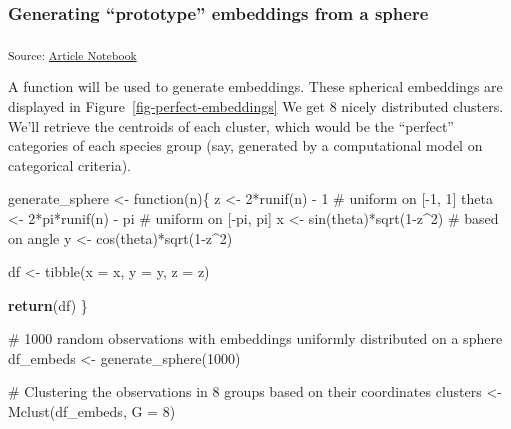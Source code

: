 \documentclass[
  authoryear]{elsarticle}
\newenvironment{Shaded}{\begin{snugshade}}{\end{snugshade}}
\newcommand{\CommentTok}[1]{\textcolor[rgb]{0.37,0.37,0.37}{#1}}
\newcommand{\ControlFlowTok}[1]{\textcolor[rgb]{0.00,0.23,0.31}{\textbf{#1}}}
\newcommand{\DecValTok}[1]{\textcolor[rgb]{0.68,0.00,0.00}{#1}}
\newcommand{\NormalTok}[1]{\textcolor[rgb]{0.00,0.23,0.31}{#1}}
\newcommand{\OperatorTok}[1]{\textcolor[rgb]{0.37,0.37,0.37}{#1}}
\begin{document}
\subsubsection{Generating ``prototype'' embeddings from a
sphere}\label{generating-prototype-embeddings-from-a-sphere}

\textsubscript{Source:
\href{https://m-delem.github.io/2499-similarity-manuscript/index.qmd.html}{Article
Notebook}}

A function will be used to generate embeddings. These spherical
embeddings are displayed in Figure~\ref{fig-perfect-embeddings} We get 8
nicely distributed clusters. We'll retrieve the centroids of each
cluster, which would be the ``perfect'' categories of each species group
(say, generated by a computational model on categorical criteria).

\begin{Shaded}
\begin{Highlighting}[]
\NormalTok{generate\_sphere }\OperatorTok{\textless{}{-}}\NormalTok{ function(n)\{}
\NormalTok{  z     }\OperatorTok{\textless{}{-}} \DecValTok{2}\OperatorTok{*}\NormalTok{runif(n) }\OperatorTok{{-}} \DecValTok{1}          \CommentTok{\# uniform on [{-}1, 1]}
\NormalTok{  theta }\OperatorTok{\textless{}{-}} \DecValTok{2}\OperatorTok{*}\NormalTok{pi}\OperatorTok{*}\NormalTok{runif(n) }\OperatorTok{{-}}\NormalTok{ pi      }\CommentTok{\# uniform on [{-}pi, pi]}
\NormalTok{  x     }\OperatorTok{\textless{}{-}}\NormalTok{ sin(theta)}\OperatorTok{*}\NormalTok{sqrt(}\DecValTok{1}\OperatorTok{{-}}\NormalTok{z}\OperatorTok{\^{}}\DecValTok{2}\NormalTok{)  }\CommentTok{\# based on angle}
\NormalTok{  y     }\OperatorTok{\textless{}{-}}\NormalTok{ cos(theta)}\OperatorTok{*}\NormalTok{sqrt(}\DecValTok{1}\OperatorTok{{-}}\NormalTok{z}\OperatorTok{\^{}}\DecValTok{2}\NormalTok{) }
  
\NormalTok{  df }\OperatorTok{\textless{}{-}}\NormalTok{ tibble(x }\OperatorTok{=}\NormalTok{ x, y }\OperatorTok{=}\NormalTok{ y, z }\OperatorTok{=}\NormalTok{ z)}
  
  \ControlFlowTok{return}\NormalTok{(df)}
\NormalTok{\}}

\CommentTok{\# 1000 random observations with embeddings uniformly distributed on a sphere}
\NormalTok{df\_embeds }\OperatorTok{\textless{}{-}}\NormalTok{ generate\_sphere(}\DecValTok{1000}\NormalTok{)}

\CommentTok{\# Clustering the observations in 8 groups based on their coordinates}
\NormalTok{clusters }\OperatorTok{\textless{}{-}}\NormalTok{ Mclust(df\_embeds, G }\OperatorTok{=} \DecValTok{8}\NormalTok{)}


\end{Highlighting}
\end{Shaded}
\end{document}
